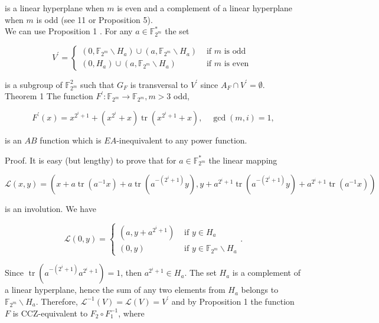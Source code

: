 \documentclass[10pt]{article}
\begin{document}
is a linear hyperplane when $m$ is even and a complement of a linear hyperplane when $m$ is odd (see 11 or Proposition 5).\\
We can use Proposition 1 . For any $a \in \mathbb{F}_{2^{m}}^{*}$ the set

$$
V^{\prime}= \begin{cases}\left(0, \mathbb{F}_{2^{m}} \backslash H_{a}\right) \cup\left(a, \mathbb{F}_{2^{m}} \backslash H_{a}\right) & \text { if } m \text { is odd } \\ \left(0, H_{a}\right) \cup\left(a, \mathbb{F}_{2^{m}} \backslash H_{a}\right) & \text { if } m \text { is even }\end{cases}
$$

is a subgroup of $\mathbb{F}_{2^{m}}^{2}$ such that $G_{F}$ is transversal to $V^{\prime}$ since $A_{F} \cap V^{\prime}=\emptyset$.\\
Theorem 1 The function $F^{\prime}: \mathbb{F}_{2^{m}} \rightarrow \mathbb{F}_{2^{m}}, m>3$ odd,

$$
F^{\prime}(x)=x^{2^{i}+1}+\left(x^{2^{i}}+x\right) \operatorname{tr}\left(x^{2^{i}+1}+x\right), \quad \operatorname{gcd}(m, i)=1,
$$

is an $A B$ function which is $E A$-inequivalent to any power function.

Proof. It is easy (but lengthy) to prove that for $a \in \mathbb{F}_{2^{m}}^{*}$ the linear mapping

$$
\mathcal{L}(x, y)=\left(x+a \operatorname{tr}\left(a^{-1} x\right)+a \operatorname{tr}\left(a^{-\left(2^{i}+1\right)} y\right), y+a^{2^{i}+1} \operatorname{tr}\left(a^{-\left(2^{i}+1\right)} y\right)+a^{2^{i}+1} \operatorname{tr}\left(a^{-1} x\right)\right)
$$

is an involution. We have

$$
\mathcal{L}(0, y)=\left\{\begin{array}{ll}
\left(a, y+a^{2^{i}+1}\right) & \text { if } y \in H_{a} \\
(0, y) & \text { if } y \in \mathbb{F}_{2^{m}} \backslash H_{a}
\end{array} .\right.
$$

Since $\operatorname{tr}\left(a^{-\left(2^{i}+1\right)} a^{2^{i}+1}\right)=1$, then $a^{2^{i}+1} \in H_{a}$. The set $H_{a}$ is a complement of a linear hyperplane, hence the sum of any two elements from $H_{a}$ belongs to $\mathbb{F}_{2^{m}} \backslash H_{a}$. Therefore, $\mathcal{L}^{-1}(V)=\mathcal{L}(V)=V^{\prime}$ and by Proposition 1 the function $F$ is CCZ-equivalent to $F_{2} \circ F_{1}^{-1}$, where
\end{document}
